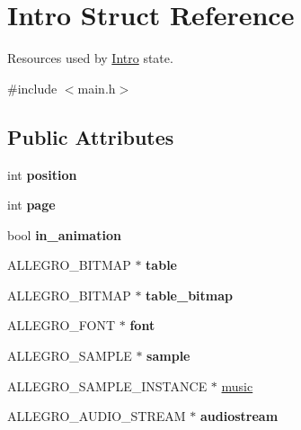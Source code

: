 \hypertarget{structIntro}{\section{\-Intro \-Struct \-Reference}
\label{structIntro}
}


\-Resources used by \hyperlink{structIntro}{\-Intro} state.  




{\ttfamily \#include $<$main.\-h$>$}

\subsection*{\-Public \-Attributes}
\begin{DoxyCompactItemize}
\item 
\hypertarget{structIntro_a5c266b2590d4304f92fd3bad033f4375}{int {\bfseries position}}\label{structIntro_a5c266b2590d4304f92fd3bad033f4375}

\item 
\hypertarget{structIntro_aaea1b2d24c0c9a5437c59d727c79ebd1}{int {\bfseries page}}\label{structIntro_aaea1b2d24c0c9a5437c59d727c79ebd1}

\item 
\hypertarget{structIntro_a2876fd8a7bfd940c3936eb6445984a22}{bool {\bfseries in\-\_\-animation}}\label{structIntro_a2876fd8a7bfd940c3936eb6445984a22}

\item 
\hypertarget{structIntro_a342227f3940dba9ed6b5d3bb4579fd48}{\-A\-L\-L\-E\-G\-R\-O\-\_\-\-B\-I\-T\-M\-A\-P $\ast$ {\bfseries table}}\label{structIntro_a342227f3940dba9ed6b5d3bb4579fd48}

\item 
\hypertarget{structIntro_a77ea358d1f44d69e5477f5dedfc9fd2b}{\-A\-L\-L\-E\-G\-R\-O\-\_\-\-B\-I\-T\-M\-A\-P $\ast$ {\bfseries table\-\_\-bitmap}}\label{structIntro_a77ea358d1f44d69e5477f5dedfc9fd2b}

\item 
\hypertarget{structIntro_a896d4fdd74cf47535173eeaa6e81f734}{\-A\-L\-L\-E\-G\-R\-O\-\_\-\-F\-O\-N\-T $\ast$ {\bfseries font}}\label{structIntro_a896d4fdd74cf47535173eeaa6e81f734}

\item 
\hypertarget{structIntro_a0189475d44f8e19e6fe543371a9daedb}{\-A\-L\-L\-E\-G\-R\-O\-\_\-\-S\-A\-M\-P\-L\-E $\ast$ {\bfseries sample}}\label{structIntro_a0189475d44f8e19e6fe543371a9daedb}

\item 
\-A\-L\-L\-E\-G\-R\-O\-\_\-\-S\-A\-M\-P\-L\-E\-\_\-\-I\-N\-S\-T\-A\-N\-C\-E $\ast$ \hyperlink{structIntro_a461ce3f44fd4f7d2d3713e2f31c1d1ec}{music}
\item 
\hypertarget{structIntro_a879aa48597b2f7b6fbeb9f9911234350}{\-A\-L\-L\-E\-G\-R\-O\-\_\-\-A\-U\-D\-I\-O\-\_\-\-S\-T\-R\-E\-A\-M $\ast$ {\bfseries audiostream}}\label{structIntro_a879aa48597b2f7b6fbeb9f9911234350}

\end{DoxyCompactItemize}


